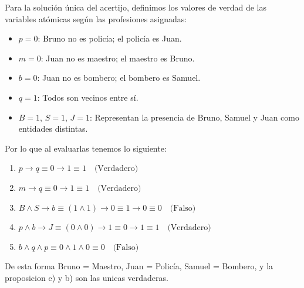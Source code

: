 \begin{enumerate}[label=\arabic*., leftmargin=*]
    Para la solución única del acertijo, definimos los valores de verdad de las variables atómicas según las profesiones asignadas:

\begin{itemize}
    \item $p = 0$: Bruno no es policía; el policía es Juan.
    \item $m = 0$: Juan no es maestro; el maestro es Bruno.
    \item $b = 0$: Juan no es bombero; el bombero es Samuel.
    \item $q = 1$: Todos son vecinos entre sí.
    \item $B = 1$, $S = 1$, $J = 1$: Representan la presencia de Bruno,
    Samuel y Juan como entidades distintas.
\end{itemize}
    Por lo que al evaluarlas tenemos lo siguiente:
    \begin{enumerate}
\item $p \rightarrow q \equiv 0 \rightarrow 1 \equiv 1 \quad \text{(Verdadero)}$
\item $m \rightarrow q \equiv 0 \rightarrow 1 \equiv 1 \quad \text{(Verdadero)}$
\item $B \wedge S \rightarrow b \equiv (1 \wedge 1) \rightarrow 0 \equiv 1 \rightarrow 0 \equiv 0 \quad \text{(Falso)}$
\item $p \wedge b \rightarrow J \equiv (0 \wedge 0) \rightarrow 1 \equiv 0 \rightarrow 1 \equiv 1 \quad \text{(Verdadero)}$
\item $b \wedge q \wedge p \equiv 0 \wedge 1 \wedge 0 \equiv 0 \quad \text{(Falso)}$
\end{enumerate}

    De esta forma Bruno = Maestro, Juan = Policía, Samuel = Bombero, y la proposicion e) y b) son las unicas verdaderas.\\


\end{enumerate}
